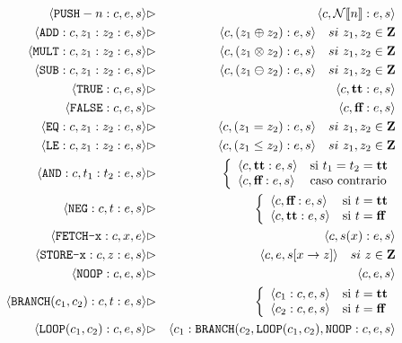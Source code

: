 \begin{sist*}

\begin{eqnarray*}
    \langle \texttt{PUSH}-n:c, e, s \rangle &\rhd& \langle c, \mathcal{N}[\![n]\!]:e, s \rangle \\
    \langle \texttt{ADD}:c, z_1:z_2:e, s \rangle &\rhd& \langle c, (z_1\oplus z_2):e, s \rangle \quad si \ z_1, z_2 \in \mathbf{Z} \\
    \langle \texttt{MULT}:c, z_1:z_2:e, s \rangle &\rhd& \langle c, (z_1\otimes z_2):e, s \rangle \quad si \ z_1, z_2 \in \mathbf{Z} \\
    \langle \texttt{SUB}:c, z_1:z_2:e, s \rangle &\rhd& \langle c, (z_1\ominus z_2):e, s \rangle \quad si \ z_1, z_2 \in \mathbf{Z} \\
    \langle \texttt{TRUE}:c, e, s \rangle &\rhd& \langle c, \textbf{tt}:e, s \rangle \\
    \langle \texttt{FALSE}:c, e, s \rangle &\rhd& \langle c, \textbf{ff}:e, s \rangle \\
    \langle \texttt{EQ}:c, z_1:z_2:e, s \rangle &\rhd& \langle c, (z_1 = z_2):e, s \rangle \quad si \ z_1, z_2 \in \mathbf{Z}\\
    \langle \texttt{LE}:c, z_1:z_2:e, s \rangle &\rhd& \langle c, (z_1 \leq z_2):e, s \rangle\quad si \ z_1, z_2 \in \mathbf{Z} \\
    \langle \texttt{AND}:c, t_1:t_2:e, s \rangle &\rhd& 
        \left\{\begin{array}{ll} 
            \langle c, \textbf{tt}:e, s \rangle & \text{si }t_1 = t_2 = \textbf{tt} \\
            \langle c, \textbf{ff}:e, s \rangle & \text{caso contrario}
        \end{array}\right. 
    \\
    \langle \texttt{NEG}:c, t:e, s \rangle &\rhd& 
        \left\{\begin{array}{ll} 
            \langle c, \textbf{ff}:e, s \rangle & \text{si }t = \textbf{tt} \\
            \langle c, \textbf{tt}:e, s \rangle & \text{si }t = \textbf{ff}
        \end{array}\right. \\
    \langle \texttt{FETCH-x}:c, x, e \rangle &\rhd&  \langle c, s(x):e, s \rangle
    \\
    \langle \texttt{STORE-x}:c, z:e, s \rangle &\rhd&  \langle c, e, s[x\to z] \rangle \quad si \ z \in \mathbf{Z}
    \\
    \langle \texttt{NOOP}:c, e, s \rangle &\rhd&  \langle c, e, s \rangle 
    \\
    \langle \texttt{BRANCH}(c_1, c_2):c, t:e, s \rangle &\rhd& 
        \left\{\begin{array}{ll} 
            \langle c_1:c, e, s \rangle & \text{si }t = \textbf{tt} \\
            \langle c_2:c, e, s \rangle & \text{si }t = \textbf{ff}
        \end{array}\right.
    \\
    \langle \texttt{LOOP}(c_1,c_2):c, e, s \rangle &\rhd&  \langle c_1 : \texttt{BRANCH}(c_2, \texttt{LOOP}(c_1,c_2), \texttt{NOOP}:c, e, s \rangle 
\end{eqnarray*}
\end{sist*}
